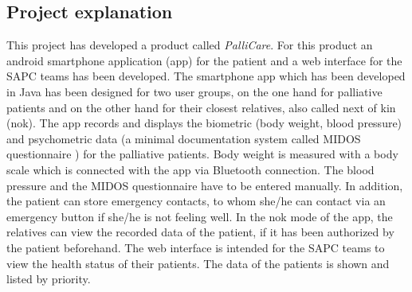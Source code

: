 \documentclass[12pt,twoside]{article}
\begin{document}
\subsection{Project explanation}
This project has developed a product called \textit{PalliCare}. For this product an android smartphone application (app) for the patient and a web interface for the SAPC teams has been developed.  
The smartphone app which has been developed in Java has been designed for two user groups, on the one hand for palliative patients and on the other hand for their closest relatives, also called next of kin (nok). The app records and displays the biometric (body weight, blood pressure) and psychometric data (a minimal documentation system called MIDOS questionnaire \cite{midos}) for the palliative patients. Body weight is measured with a body scale which is connected with the app via Bluetooth connection. The blood pressure and the MIDOS questionnaire have to be entered manually. In addition, the patient can store emergency contacts, to whom she/he can contact via an emergency button if she/he is not feeling well. 
In the nok mode of the app, the relatives can view the recorded data of the patient, if it has been authorized by the patient beforehand.
The web interface is intended for the SAPC teams to view the health status of their patients. The data of the patients is shown and listed by priority.







\clearpage


\end{document}
